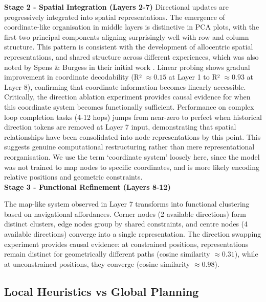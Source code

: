 \textbf{Stage 2 - Spatial Integration (Layers 2-7)}
Directional updates are progressively integrated into spatial representations. The emergence of coordinate-like organisation in middle layers is distinctive in PCA plots, with the first two principal components aligning surprisingly well with row and column structure. This pattern is consistent with the development of allocentric spatial representations, and shared structure across different experiences, which was also noted by Spens \& Burgess in their initial work \citep{Spens2024consolidation}. Linear probing shows gradual improvement in coordinate decodability (R² $\approx0.15$ at Layer 1 to R² $\approx0.93$ at Layer 8), confirming that coordinate information becomes linearly accessible. Critically, the direction ablation experiment provides causal evidence for when this coordinate system becomes functionally sufficient. Performance on complex loop completion tasks (4-12 hops) jumps from near-zero to perfect when historical direction tokens are removed at Layer 7 input, demonstrating that spatial relationships have been consolidated into node representations by this point. This suggests genuine computational restructuring rather than mere representational reorganisation.  We use the term `coordinate system' loosely here, since the model was not trained to map nodes to specific coordinates, and is more likely encoding relative positions and geometric constraints.\\

\textbf{Stage 3 - Functional Refinement (Layers 8-12)}

The map-like system observed in Layer 7 transforms into functional clustering based on navigational affordances. Corner nodes (2 available directions) form distinct clusters, edge nodes group by shared constraints, and centre nodes (4 available directions) converge into a single representation. The direction swapping experiment provides causal evidence: at constrained positions, representations remain distinct for geometrically different paths (cosine similarity $\approx 0.31$), while at unconstrained positions, they converge (cosine similarity $\approx 0.98$).\\


\subsection{Local Heuristics vs Global Planning}

